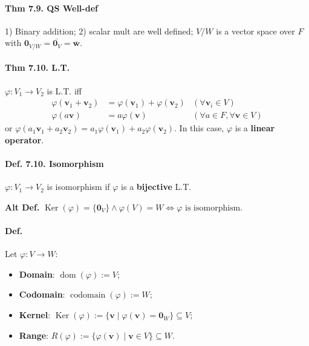 \paragraph{Thm 7.9. QS Well-def} 1) Binary addition; 2) scalar mult are well defined; $V/W$ is a vector space over $F$ with $\mathbf{0}_{V/W}=\overline{\mathbf{0}_V}=\overline{\mathbf{w}}$.

\paragraph{Thm 7.10. L.T.} $\varphi: V_1\rightarrow V_2$ is L.T. iff
$$
\begin{aligned}
\varphi(\mathbf{v}_1 + \mathbf{v}_2) &= \varphi(\mathbf{v}_1) + \varphi(\mathbf{v}_2) & (\forall \mathbf{v}_i \in V)\\
\varphi(a\mathbf{v}) &= a\varphi (\mathbf{v}) & (\forall a \in F, \forall \mathbf{v}\in V)
\end{aligned}
$$
or $\varphi(a_1\mathbf{v}_1 + a_2 \mathbf{v}_2) = a_1 \varphi (\mathbf{v}_1) + a_2 \varphi (\mathbf{v}_2)$. In this case, $\varphi$ is a \textbf{linear operator}. 

\paragraph{Def. 7.10. Isomorphism} $\varphi: V_1\rightarrow V_2$ is isomorphism if $\varphi$ is a \textbf{bijective} L.T. 

\textbf{Alt Def.} $\operatorname{Ker}(\varphi) = \{\mathbf{0}_V\} \land \varphi(V)=W \Leftrightarrow \varphi \text{ is isomorphism}$. 

\paragraph{Def.} Let $\varphi: V\rightarrow W$:
\begin{itemize}[noitemsep,nolistsep]
    \item \textbf{Domain}: $\operatorname{dom}(\varphi) := V$;
    \item \textbf{Codomain}: $\operatorname{codomain}(\varphi):=W$;
    \item \textbf{Kernel}: $\operatorname{Ker}(\varphi):=\{\mathbf{v}\mid \varphi(\mathbf{v}) = \mathbf{0}_W\}\subseteq V$;
    \item \textbf{Range}: $R(\varphi):=\{\varphi(\mathbf{v})\mid \mathbf{v}\in V\}\subseteq W$.
\end{itemize}

